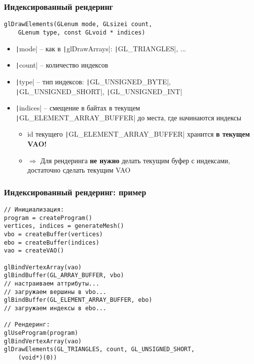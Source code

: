 \documentclass[10pt]{beamer}
\begin{document}
\begin{frame}[fragile]
\frametitle{Индексированный рендеринг}
\begin{verbatim}
glDrawElements(GLenum mode, GLsizei count,
    GLenum type, const GLvoid * indices)
\end{verbatim}
\vspace*{-0.5cm}
\pause
\begin{itemize}
\item \texttt|mode| -- как в \texttt|glDrawArrays|: \texttt|GL_TRIANGLES|, ...
\pause
\item \texttt|count| -- количество индексов
\pause
\item \texttt|type| -- тип индексов: \texttt|GL_UNSIGNED_BYTE|, \texttt|GL_UNSIGNED_SHORT|, \texttt|GL_UNSIGNED_INT|
\pause
\item \texttt|indices| -- смещение в байтах в текущем \texttt|GL_ELEMENT_ARRAY_BUFFER| до места, где начинаются индексы
\pause
\begin{itemize}
\item id текущего \texttt|GL_ELEMENT_ARRAY_BUFFER| хранится \alert{\textbf{в текущем VAO!}}
\pause
\item \begin{math}\Longrightarrow\end{math} Для рендеринга \alert{\textbf{не нужно}} делать текущим буфер с индексами, достаточно сделать текущим VAO
\end{itemize}
\end{itemize}
\end{frame}

\begin{frame}[fragile]
\frametitle{Индексированный рендеринг: пример}
\begin{verbatim}
// Инициализация:
program = createProgram()
vertices, indices = generateMesh()
vbo = createBuffer(vertices)
ebo = createBuffer(indices)
vao = createVAO()

glBindVertexArray(vao)
glBindBuffer(GL_ARRAY_BUFFER, vbo)
// настраиваем аттрибуты...
// загружаем вершины в vbo...
glBindBuffer(GL_ELEMENT_ARRAY_BUFFER, ebo)
// загружаем индексы в ebo...

// Рендеринг:
glUseProgram(program)
glBindVertexArray(vao)
glDrawElements(GL_TRIANGLES, count, GL_UNSIGNED_SHORT,
    (void*)(0))
\end{verbatim}
\end{frame}
\end{document}

